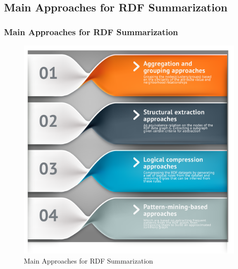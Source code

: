 \documentclass{beamer}
\numberwithin{figure}{section}
\numberwithin{equation}{section}
\begin{document}
\subsection{Main Approaches for RDF Summarization }
\begin{frame} \scriptsize
 \frametitle{Main Approaches for RDF Summarization\cite{Zneika2018}}
	\begin{figure}[p]
  		\centering
  		\includegraphics[width=0.7\linewidth]{pictures/approaches_RDF}
  		\caption{\scriptsize Main Approaches for RDF Summarization\cite{Zneika2018}}
  		\label{fig:approaches_RDF}
 	\end{figure}
 
 
\end{frame}
\end{document}

